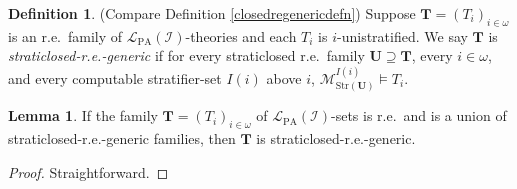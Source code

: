 \documentclass[reqno]{article}
\theoremstyle{definition}
\newtheorem{lemma}[theorem]{Lemma}
\newtheorem{definition}[theorem]{Definition}
\def\L{\mathscr{L}}
\def\M{\mathscr{M}}
\def\T{\mathbf{T}}
\def\U{\mathbf{U}}
\def\LPA{\L_{\mathrm{PA}}}
\def\indset{\mathcal I}
\newcommand{\str}[1]{\mathrm{Str}(#1)} \newcommand{\Str}[1]{\str{#1}}
\begin{document}
\begin{definition}
\label{bootstrapclosedrestrat}
(Compare Definition \ref{closedregenericdefn})
Suppose $\T=(T_i)_{i\in\omega}$
is an r.e.~family of $\LPA(\indset)$-theories
and each $T_i$ is $i$-unistratified.
We say $\T$ is \emph{straticlosed-r.e.-generic} if
for every straticlosed r.e.~family $\U\supseteq\T$, every $i\in\omega$,
and every computable stratifier-set $I(i)$ above $i$,
$\M^{I(i)}_{\str\U}\models T_i$.
\end{definition}


\begin{lemma}
If the family $\T=(T_i)_{i\in\omega}$ of $\LPA(\indset)$-sets is r.e.~and is a union
of straticlosed-r.e.-generic families, then $\T$ is straticlosed-r.e.-generic.
\end{lemma}

\begin{proof}
Straightforward.
\end{proof}
\end{document}
